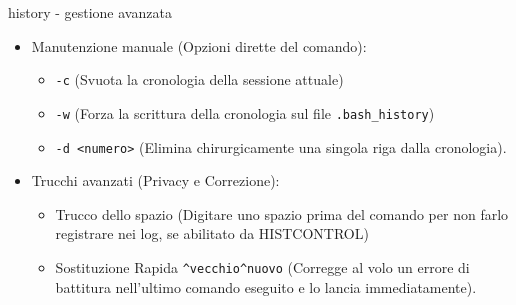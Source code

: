 \begin{frame}{history - gestione avanzata}
\begin{itemize}
\begin{itemize}
	\end{itemize}
	\framebreak
	\item Manutenzione manuale (Opzioni dirette del comando):
	\begin{itemize}
	\item \verb|-c| (Svuota la cronologia della sessione attuale) \item \verb|-w| (Forza la scrittura della cronologia sul file \verb|.bash_history|) \item \verb|-d <numero>| (Elimina chirurgicamente una singola riga dalla cronologia).
	\end{itemize}
	\item Trucchi avanzati (Privacy e Correzione):
	\begin{itemize}
	\item Trucco dello spazio (Digitare uno spazio prima del comando per non farlo registrare nei log, se abilitato da HISTCONTROL) \item Sostituzione Rapida \verb|^vecchio^nuovo| (Corregge al volo un errore di battitura nell'ultimo comando eseguito e lo lancia immediatamente).
	\end{itemize}
\end{itemize}

\end{frame}

